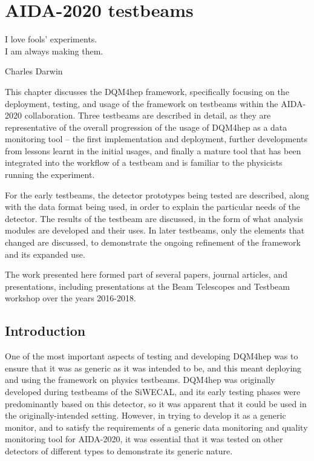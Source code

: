 \chapter{AIDA-2020 testbeams}
\label{chapter:aidatestbeams}

\epigraph{I love fools' experiments. \\I am always making them.}{Charles Darwin}

This chapter discusses the \acrshort{DQM4hep} framework, specifically focusing on the deployment, testing, and usage of the framework on testbeams within the AIDA-2020 collaboration. Three testbeams are described in detail, as they are representative of the overall progression of the usage of \acrshort{DQM4hep} as a data monitoring tool -- the first implementation and deployment, further developments from lessons learnt in the initial usages, and finally a mature tool that has been integrated into the workflow of a testbeam and is familiar to the physicists running the experiment.

For the early testbeams, the detector prototypes being tested are described, along with the data format being used, in order to explain the particular needs of the detector. The results of the testbeam are discussed, in the form of what analysis modules are developed and their uses. In later testbeams, only the elements that changed are discussed, to demonstrate the ongoing refinement of the framework and its expanded use.

The work presented here formed part of several papers, journal articles, and presentations, including presentations at the Beam Telescopes and Testbeam workshop over the years 2016-2018.

\section{Introduction}
One of the most important aspects of testing and developing \acrshort{DQM4hep} was to ensure that it was as generic as it was intended to be, and this meant deploying and using the framework on physics testbeams. \acrshort{DQM4hep} was originally developed during testbeams of the \acrfull{SiWECAL}, and its early testing phases were predominantly based on this detector, so it was apparent that it could be used in the originally-intended setting. However, in trying to develop it as a generic monitor, and to satisfy the requirements of a generic data monitoring and quality monitoring tool for AIDA-2020, it was essential that it was tested on other detectors of different types to demonstrate its generic nature. 

